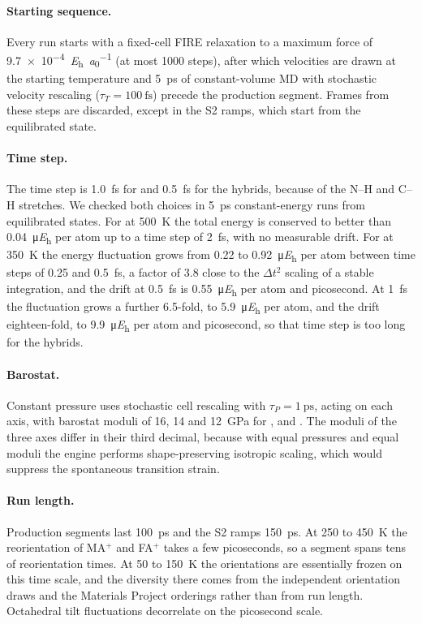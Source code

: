 \paragraph{Starting sequence.} Every run starts with a fixed-cell FIRE\cite{Bitzek2006PRL} relaxation
to a maximum force of \SI{9.7e-4}{\hartree\per\bohr} (at most 1000 steps), after which velocities are
drawn at the starting temperature and \SI{5}{\pico\second} of constant-volume MD with stochastic
velocity rescaling\cite{Bussi2007JCP} ($\tau_T=\SI{100}{\femto\second}$) precede the production
segment. Frames from these steps are discarded, except in the S2 ramps, which start from the
equilibrated state.

\paragraph{Time step.} The time step is \SI{1.0}{\femto\second} for \CsSnI{} and
\SI{0.5}{\femto\second} for the hybrids, because of the N--H and C--H stretches. We checked both
choices in \SI{5}{\pico\second} constant-energy runs from equilibrated states. For \CsSnI{} at
\SI{500}{\kelvin} the total energy is conserved to better than \SI{0.04}{\micro\hartree} per atom up
to a time step of \SI{2}{\femto\second}, with no measurable drift. For \MASnI{} at \SI{350}{\kelvin}
the energy fluctuation grows from 0.22 to \SI{0.92}{\micro\hartree} per atom between time steps of
0.25 and \SI{0.5}{\femto\second}, a factor of 3.8 close to the $\Delta t^2$ scaling of a stable
integration, and the drift at \SI{0.5}{\femto\second} is \SI{0.55}{\micro\hartree} per atom and
picosecond. At \SI{1}{\femto\second} the fluctuation grows a further 6.5-fold, to
\SI{5.9}{\micro\hartree} per atom, and the drift eighteen-fold, to \SI{9.9}{\micro\hartree} per atom and
picosecond, so that time step is too long for the hybrids.

\paragraph{Barostat.} Constant pressure uses stochastic cell rescaling\cite{Bernetti2020JCP} with
$\tau_P=\SI{1}{\pico\second}$, acting on each axis, with barostat moduli of 16, 14 and
\SI{12}{\giga\pascal} for \CsSnI{}, \MASnI{} and \FASnI{}. The moduli of the three axes differ in their
third decimal, because with equal pressures and equal moduli the engine performs shape-preserving
isotropic scaling, which would suppress the spontaneous transition strain.

\paragraph{Run length.} Production segments last \SI{100}{\pico\second} and the S2 ramps
\SI{150}{\pico\second}. At 250 to \SI{450}{\kelvin} the reorientation of MA$^+$ and FA$^+$ takes a few
picoseconds, so a segment spans tens of reorientation times. At 50 to \SI{150}{\kelvin} the
orientations are essentially frozen on this time scale, and the diversity there comes from the
independent orientation draws and the Materials Project orderings rather than from run length.
Octahedral tilt fluctuations decorrelate on the picosecond scale.

